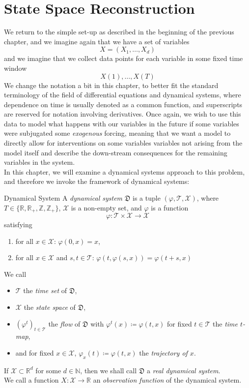\documentclass[11pt, a4paper]{memoir}
\theoremstyle{break}
\theoremstyle{break}
\theoremstyle{nonumberplain}
\newcommand{\mN}{\mathbb{N}}
\newcommand{\mZ}{\mathbb{Z}}
\newcommand{\mR}{\mathbb{R}}
\begin{document}
\chapter{State Space Reconstruction}
We return to the simple set-up as described in the beginning of the previous chapter, and we imagine again that we have a set of variables
$$X=(X_1,\ldots, X_d)$$
and we imagine that we collect data points for each variable in some fixed time window 
$$X(1),\ldots, X(T)$$
We change the notation a bit in this chapter, to better fit the standard terminology of the field of differential equations and dynamical systems, where dependence on time is usually denoted as a common function, and superscripts are reserved for notation involving derivatives. Once again, we wish to use this data to model what happens with our variables in the future if some variables were subjugated some \emph{exogenous} forcing, meaning that we want a model to directly allow for interventions on some variables variables not arising from the model itself and describe the down-stream consequences for the remaining variables in the system.\\[5pt]
In this chapter, we will examine a dynamical systems approach to this problem, and therefore we invoke the framework of dynamical systems:
\begin{mydefinition}{Dynamical System}
A \emph{dynamical system} $\mathfrak{D}$ is a tuple $(\varphi, \mathcal{T},\mathcal{X})$, where $T\in \{\mR,\mR_+,\mZ,\mZ_+\}$, $\mathcal{X}$ is a non-empty set, and $\varphi$ is a function
$$\varphi: \mathcal{T}\times \mathcal{X}\to \mathcal{X}$$
satisfying
\begin{enumerate}[label=(\roman*)]
	\item for all $x\in \mathcal{X}$: $\varphi(0,x)=x$,
	\item for all $x\in \mathcal{X}$ and $s,t \in \mathcal{T}$: $\varphi(t,\varphi(s,x))=\varphi(t+s,x)$
\end{enumerate}
We call 
\begin{itemize}
\item $\mathcal{T}$ the \emph{time set} of $\mathfrak{D}$, 
\item $\mathcal{X}$ the \emph{state space} of $\mathfrak{D}$, 
\item $(\varphi^t)_{t\in \mathcal{T}}$ the \emph{flow} of $\mathfrak{D}$ with
$\varphi^t(x)\coloneqq \varphi(t,x)$ for fixed $t\in \mathcal{T}$ the \emph{time $t$-map},
\item and for fixed $x\in \mathcal{X}$, $\varphi_x(t)\coloneqq \varphi(t,x)$ the \emph{trajectory of $x$}.
\end{itemize}
If $\mathcal{X}\subset \mR^d$ for some $d\in \mN$, then we shall call $\mathfrak{D}$ a \emph{real dynamical system}.\\[5pt]
We call a function $X:\mathcal{X}\to\mR$ an \emph{observation function} of the dynamical system.
\end{mydefinition}
\end{document}

